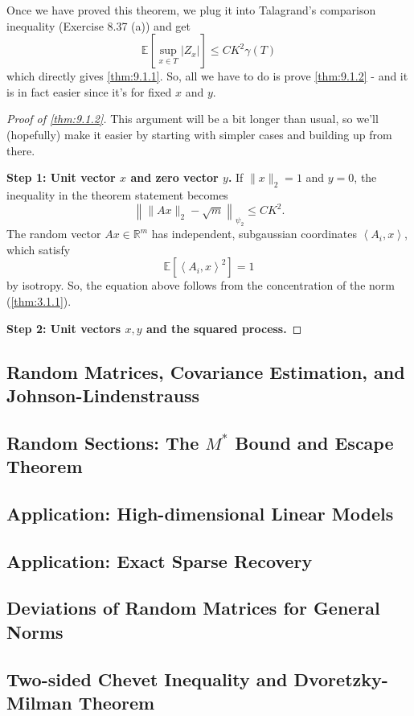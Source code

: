 Once we have proved this theorem, we plug it into Talagrand's comparison inequality (Exercise 8.37 (a)) and get 
\[ \mathbb{E}\left[ \sup_{x \in T} |Z_x| \right] \leq CK^2 \gamma(T) \]
which directly gives \cref{thm:9.1.1}. So, all we have to do is prove \cref{thm:9.1.2} - and it is in fact 
easier since it's for fixed $x$ and $y$.

\begin{proof}[Proof of \cref{thm:9.1.2}]
This argument will be a bit longer than usual, so we'll (hopefully) make it easier by starting with simpler 
cases and building up from there.

\textbf{Step 1: Unit vector $x$ and zero vector $y$.} If $\lVert x \rVert_{2} = 1$ and $y = 0$, the inequality 
in the theorem statement becomes 
\[ \left\lVert \lVert Ax \rVert_{2} - \sqrt{m} \right\rVert_{\psi_2} \leq CK^2. \]
The random vector $Ax \in \mathbb{R}^m$ has independent, subgaussian coordinates $\left\langle A_i, x
\right\rangle$, which satisfy 
\[ \mathbb{E}\left[ \left\langle A_i, x \right\rangle^2 \right] = 1 \] 
by isotropy. So, the equation above follows from the concentration of the norm (\cref{thm:3.1.1}).

\textbf{Step 2: Unit vectors $x, y$ and the squared process.}
\end{proof}



\subsection{Random Matrices, Covariance Estimation, and Johnson-Lindenstrauss}



\subsection{Random Sections: The \texorpdfstring{$M^*$}{} Bound and Escape Theorem}



\subsection{Application: High-dimensional Linear Models}



\subsection{Application: Exact Sparse Recovery}



\subsection{Deviations of Random Matrices for General Norms}



\subsection{Two-sided Chevet Inequality and Dvoretzky-Milman Theorem}




